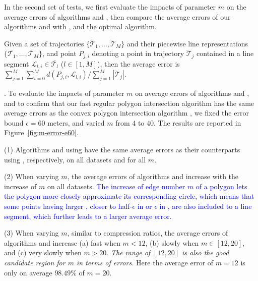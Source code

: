 {In the second set of tests, we first evaluate the impacts of parameter $m$ on the average errors of algorithms \cist and \cista, then compare the average errors of our algorithms \cist and \cista with \dps, \squishe and the optimal algorithm.

Given a set of trajectories $\{\dddot{\mathcal{T}_1}, \ldots, \dddot{\mathcal{T}}_M\}$ and their piecewise line representations $\{\overline{\mathcal{T}_1}, \ldots, \overline{\mathcal{T}}_M\}$, and point $P_{j,i}$ denoting
a point in trajectory $\dddot{\mathcal{T}}_j$ contained in a line segment $\mathcal{L}_{l,i}\in\overline{\mathcal{T}_l}$ ($l\in[1,M]$),
then the average error is $\sum_{j=1}^{M}\sum_{i=0}^{M} d(P_{j,i},
\mathcal{L}_{l,i})/\sum_{j=1}^{M}{|\dddot{\mathcal{T}}_j |}$.




.
To evaluate the impacts of parameter $m$ on average errors of algorithms \cist and \cista, and to confirm that our fast regular polygon intersection algorithm \rpia has the same average errors as the convex polygon intersection algorithm \cpia,
we fixed the error bound {$\epsilon =60$ meters}, and varied $m$ from $4$ to $40$. The results are reported in Figure~\ref{fig:m-error-e60}.



\ni(1) Algorithms \cist and \cista using \rpia have the same average errors as their counterparts using \cpia, respectively, on all datasets and for all $m$.

\ni(2) When varying $m$, the average errors of algorithms \cist and \cista increase with the increase of $m$ on all datasets.
\textcolor{blue}{The increase of edge number $m$ of a polygon lets the polygon more closely approximate its corresponding circle, which means that some points having larger \sed, \ie closer to half-$\epsilon$ in \cist or $\epsilon$ in \cista, are also included to a line segment, which further leads to a larger average error.}

\ni(3) When varying $m$, similar to compression ratios, the average errors of
algorithms \cist and \cista increase (a) fast when $m < 12$, (b) slowly when $m
\in [12, 20]$, and (c) very slowly when $m > 20$.
\emph{The range of $[12, 20]$ is also the good candidate region for $m$ in terms of errors.}
Here the average error of $m=12$ is only on average {$98.49\%$} of $m=20$.




}
